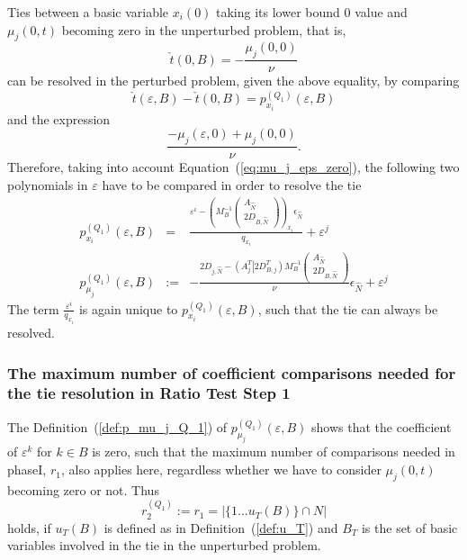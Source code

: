 \documentclass[a4paper]{article}
\newcommand{\pmu}[2]{\ensuremath{p_{\mu_{j}}^{(#1)}(\varepsilon, #2)}}
\begin{document}
Ties between a basic variable $x_{i}(0)$ taking its lower bound $0$ value and
$\mu_{j}\left(0, t\right)$ 
becoming zero in the unperturbed problem, that is,
\begin{equation*}
\check{t}\left(0, B\right)  =
-\frac{\mu_{j}\left(0, 0\right)}{\nu}
\end{equation*}
can be resolved in the perturbed problem,
given the above equality, by comparing
\begin{equation*}
\check{t}(\varepsilon, B)-\check{t}(0, B) = p_{x_{i}}^{(Q_{1})}(\varepsilon, B)
\end{equation*}
and the expression
\begin{equation*}
\frac{-\mu_{j}(\varepsilon, 0)+ \mu_{j}(0,0)}{\nu}.
\end{equation*}
Therefore, taking into account Equation~(\ref{eq:mu_j_eps_zero}),
the following two
polynomials in $\varepsilon$ have to be compared in order to resolve the tie
\begin{eqnarray}
p_{x_{i}}^{(Q_{1})}\left(\varepsilon, B\right) & = & 
    \frac{\varepsilon^{i} -
         \left(M_{B}^{-1}
           \left(\begin{array}{c}
                    A_{\hat{N}}  \\
	            \hline
	            2D_{B, \hat{N}}
	         \end{array}
	   \right)
         \right)_{x_{i}}\epsilon_{\hat{N}}}{q_{x_{i}}}
	 + \varepsilon^{j} \\
\label{def:p_mu_j_Q_1}
\pmu{Q_{1}}{B} & := &
  -\frac{2D_{j, \hat{N}} -
    \left(A_{j}^{T} \left| \right. 2D_{B, j}^{T} \right)
    M_{B}^{-1}
    \left(\begin{array}{c}
            A_{\hat{N}} \\
	    \hline
	    2D_{B,\hat{N}}
	  \end{array}
    \right)}{\nu}
  \epsilon_{\hat{N}}
  +\varepsilon^{j}      
\end{eqnarray}
The term $\frac{\varepsilon^{i}}{q_{x_{i}}}$ is again unique to 
$p_{x_{i}}^{(Q_{1})}(\varepsilon, B)$, such that the tie can always
be resolved.

\subsubsection{The maximum number of coefficient comparisons needed for the tie
resolution in Ratio Test Step 1}
The Definition~(\ref{def:p_mu_j_Q_1}) of
\pmu{Q_{1}}{B} shows that the coefficient of
$\varepsilon^{k}$ for $k \in B$ is zero, such that the maximum number of
comparisons needed in phaseI, $r_{1}$, also applies here, regardless whether we
have to consider $\mu_{j}(0, t)$ becoming zero or not. Thus
\begin{equation}
r_{2}^{(Q_{1})}:= r_{1} = \left|\{1 \ldots u_{T}(B)\} \cap N \right|
\end{equation}
holds, if $u_{T}(B)$ is defined as in Definition~(\ref{def:u_T}) and $B_{T}$ is the
set of basic variables involved in the tie in the unperturbed problem.
\end{document}
